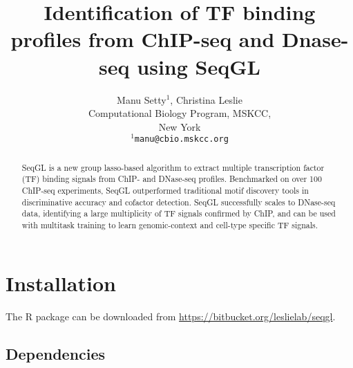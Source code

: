 \documentclass[10pt,oneside]{article}\usepackage[]{graphicx}\usepackage[]{color}
\begin{document}


\title{\bf{Identification of TF binding profiles from ChIP-seq and Dnase-seq using SeqGL}}
\author{Manu Setty$^1$, Christina Leslie\\[1em]Computational Biology Program, MSKCC,\\ New York\\
\texttt{$^1$manu@cbio.mskcc.org}}



\maketitle

\begin{abstract}
SeqGL is a new group lasso-based algorithm to extract multiple transcription factor (TF) binding signals from ChIP- and DNase-seq profiles. Benchmarked on over 100 ChIP-seq experiments, SeqGL outperformed traditional motif discovery tools in discriminative accuracy and cofactor detection. SeqGL successfully scales to DNase-seq data, identifying a large multiplicity of TF signals confirmed by ChIP, and can be used with multitask training to learn genomic-context and cell-type specific TF signals.
\end{abstract}


\tableofcontents

\section{Installation}
The R package can be downloaded from \url{https://bitbucket.org/leslielab/seqgl}. 
\subsection {Dependencies}
\end{document}
